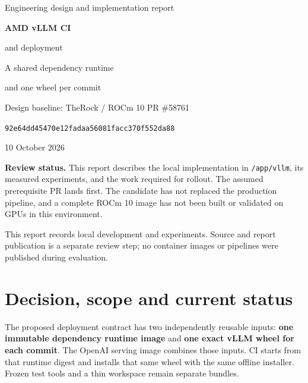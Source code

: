 \documentclass[11pt,a4paper]{article}
\newcommand{\file}[1]{\nolinkurl{#1}}
\begin{document}
\hypersetup{pageanchor=false}
\begin{titlepage}
\raggedright
\vspace*{17mm}
{\color{accent}\Large Engineering design and implementation report\par}
\vspace{10mm}
{\Huge\bfseries AMD vLLM CI\par and deployment\par}
\vspace{8mm}
{\LARGE A shared dependency runtime\par and one wheel per commit\par}
\vspace{12mm}
{\large Design baseline: TheRock / ROCm 10 PR \#58761\par}
\vspace{3mm}
\file{92e64dd45470e12fadaa56081facc370f552da88}\par
\vspace{8mm}
10 October 2026\par
\vfill
\colorbox{pale}{\parbox{0.94\textwidth}{\raggedright\vspace{3mm}
\textbf{Review status.} This report describes the local implementation in
\file{/app/vllm}, its measured experiments, and the work required for rollout.
The assumed prerequisite PR lands first. The candidate has not replaced the
production pipeline, and a complete ROCm 10 image has not been built or validated
on GPUs in this environment.\vspace{3mm}}}\par
\vspace{7mm}
{\small This report records local development and experiments. Source and report
publication is a separate review step; no container images or pipelines were
published during evaluation.\par}
\end{titlepage}

\hypersetup{pageanchor=true}
\tableofcontents
\clearpage
{}

\section{Decision, scope and current status}

The proposed deployment contract has two independently reusable inputs:
\textbf{one immutable dependency runtime image} and \textbf{one exact vLLM wheel
for each commit}. The OpenAI serving image combines those inputs. CI starts
from that runtime digest and installs that same wheel with the same offline
installer. Frozen test tools and a thin workspace remain separate bundles.
\end{document}

